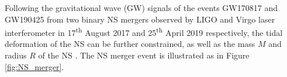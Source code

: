 
Following the gravitational wave (\gls{GW}) signals of the events GW170817 \citep{abbott2017gw170817} and GW190425 \citep{abbott2020gw190425} from two binary \gls{NS} mergers observed by LIGO and Virgo laser interferometer in 17\textsuperscript{th} August 2017 and 25\textsuperscript{th} April 2019 respectively, the tidal deformation of the \gls{NS} can be further constrained, as well as the mass $M$ and radius $R$ of the \gls{NS} \citep{abbott2018gw170817}. The \gls{NS} merger event is illustrated as in Figure \ref{fig:NS_merger}.

